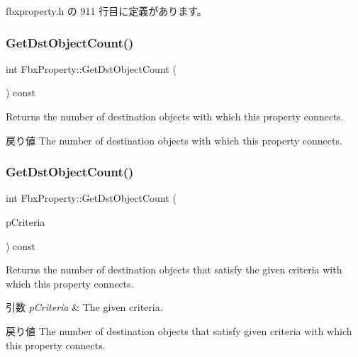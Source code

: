  fbxproperty.\+h の 911 行目に定義があります。

\mbox{\label{class_fbx_property_a8a87e8b905f4a30eac5d382fa6b95dbc}} 
\subsubsection{\texorpdfstring{Get\+Dst\+Object\+Count()}{GetDstObjectCount()}\hspace{0.1cm}{\footnotesize\ttfamily [1/4]}}
{\footnotesize\ttfamily int Fbx\+Property\+::\+Get\+Dst\+Object\+Count (\begin{DoxyParamCaption}{ }\end{DoxyParamCaption}) const}

Returns the number of destination objects with which this property connects. \begin{DoxyReturn}{戻り値}
The number of destination objects with which this property connects. 
\end{DoxyReturn}
\mbox{\label{class_fbx_property_acfca6ad7f8a1eebfecc838e91b7af100}} 
\subsubsection{\texorpdfstring{Get\+Dst\+Object\+Count()}{GetDstObjectCount()}\hspace{0.1cm}{\footnotesize\ttfamily [2/4]}}
{\footnotesize\ttfamily int Fbx\+Property\+::\+Get\+Dst\+Object\+Count (\begin{DoxyParamCaption}\item[{const \hyperlink{class_fbx_criteria}{Fbx\+Criteria} \&}]{p\+Criteria }\end{DoxyParamCaption}) const}

Returns the number of destination objects that satisfy the given criteria with which this property connects. 
\begin{DoxyParams}{引数}
{\em p\+Criteria} & The given criteria. \\
\hline
\end{DoxyParams}
\begin{DoxyReturn}{戻り値}
The number of destination objects that satisfy given criteria with which this property connects. 
\end{DoxyReturn}
\mbox{\label{class_fbx_property_a99dd8bf0103c66a7a8bf3a5ea72e41bd}} 
